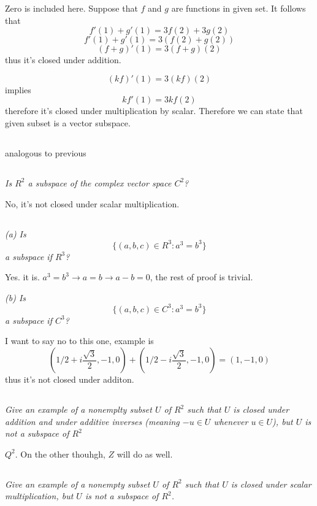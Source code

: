 \documentclass[11pt,oneside,titlepage]{book}
\begin{document}
Zero is included here. Suppose that $f$ and $g$ are functions in given set.
It follows that
$$f'(1) + g'(1) = 3f(2) + 3g(2)$$
$$f'(1) + g'(1) = 3(f(2) + g(2))$$
$$(f + g)'(1) = 3(f + g)(2)$$
thus it's closed under addition.

$$(kf)'(1) = 3(kf)(2)$$
implies
$$kf'(1) = 3kf(2)$$
therefore it's closed under multiplication by scalar.
Therefore we can state that given subset is a vector subspace.

\subsection{}
analogous to previous

\subsection{}
\textit{Is $R^2$ a subspace of the complex vector space $C^2$?}

No, it's not closed under scalar multiplication.

\subsection{}
\textit{(a) Is }
$$\{(a, b, c) \in R^3: a^3 = b^3\}$$
\textit{a subspace if $R^3$?}

Yes. it is. $a^3 = b^3 \to a = b \to a - b = 0$, the rest of proof is trivial.

\textit{(b) Is }
$$\{(a, b, c) \in C^3: a^3 = b^3\}$$
\textit{a subspace if $C^3$?}

I want to say no to this one, example is
$$(1/2 + i\frac{\sqrt{3}}{2}, -1, 0) +
(1/2 - i\frac{\sqrt{3}}{2}, -1, 0) =
(1, -1, 0)$$
thus it's not closed under additon.

\subsection{}
\textit{Give an example of a nonemplty subset $U$ of $R^2$ such that $U$ is
  closed under addition and under additive inverses (meaning $-u \in U$
  whenever $u \in U$), but $U$ is not a subspace of $R^2$}

$Q^2$. On the other thouhgh, $Z$ will do as well.

\subsection{}
\textit{Give an example of a nonempty subset $U$ of $R^2$ such that $U$ is
  closed under scalar multiplication, but $U$ is not a subspace of $R^2$.}
\end{document}

